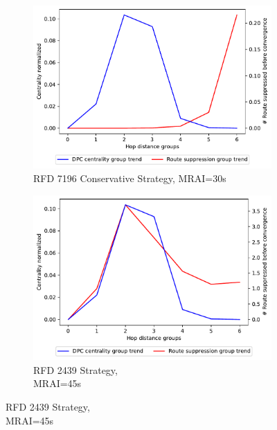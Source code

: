 \begin{figure}[H]
\begin{subfigure}[b]{0.325\textwidth}
     \end{subfigure}
     \hfill
     \begin{subfigure}[b]{0.325\textwidth}
         \centering
         \includegraphics[width=\textwidth]{images/RFD/miceVSelephants/MultiMRAI/30/mice/cisco_1000_RFD_7196_conservative_nodeConvergence_centVSsup_trend.pdf}
         \caption{RFD 7196 Conservative Strategy, MRAI=30s}
         \label{fig:1000_7196RFDC_centVSsup_mices}
     \end{subfigure}
     \vfill
     \begin{subfigure}[b]{0.325\textwidth}
         \centering
         \includegraphics[width=\textwidth]{images/RFD/miceVSelephants/MultiMRAI/45/mice/cisco_1000_RFD_nodeConvergence_centVSsup_trend.pdf}
         \caption{RFD 2439 Strategy, \\MRAI=45s}
         \label{fig:1000_2439RFD_centVSsup_mices}

\end{subfigure}
\end{figure}
